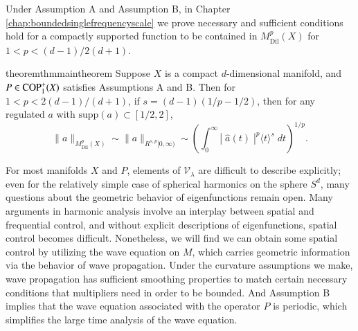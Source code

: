 Under Assumption A and Assumption B, in Chapter \ref{chap:boundedsinglefrequencyscale} we prove necessary and sufficient conditions hold for a compactly supported function to be contained in $M^p_{\text{Dil}}(X)$ for $1 < p < (d-1)/2(d+1)$.

\begin{restatable}{theorem}{thmmaintheorem} \label{maintheorem}
  Suppose $X$ is a compact $d$-dimensional manifold, and $P \in {\text{COP}^{+}_{{1}}}(X)$ satisfies Assumptions A and B. Then for $1 < p < 2(d-1)/(d+1)$, if $s = (d-1)(1/p - 1/2)$, then for any regulated $a$ with $\text{supp}(a) \subset [1/2,2]$,
  \[ \| a \|_{M^p_{\text{Dil}}(X)} \sim \| a \|_{R^{s,p}[0,\infty)} \sim \left( \int_0^\infty |\;\!\widehat{a}(t)\;\!|^p \langle t \rangle^s\; dt \right)^{1/p}. \]
\end{restatable}

For most manifolds $X$ and $P$, elements of $\mathcal{V}_\lambda$ are difficult to describe explicitly; even for the relatively simple case of spherical harmonics on the sphere $S^d$, many questions about the geometric behavior of eigenfunctions remain open. Many arguments in harmonic analysis involve an interplay between spatial and frequential control, and without explicit descriptions of eigenfunctions, spatial control becomes difficult. Nonetheless, we will find we can obtain some spatial control by utilizing the wave equation on $M$, which carries geometric information via the behavior of wave propagation. Under the curvature assumptions we make, wave propagation has sufficient smoothing properties to match certain necessary conditions that multipliers need in order to be bounded. And Assumption B implies that the wave equation associated with the operator $P$ is periodic, which simplifies the large time analysis of the wave equation.

